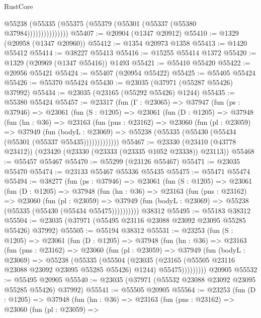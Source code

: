 \begin{lexlean}{RustCore}
\begin{coremodule}
                    @55238 (@55335 (@55375 (@55379 (@55301 (@55337 (@55380 @37984)))))))))))))))
@55407 := @20904 (@1347 @20912)
@55410 := @1329 (@20958 (@1347 @20960))
@55412 := @1354 @20973 @1358
@55413 := @1420 @55412
@55414 := @38227 @55413
@55416 := @15255 @55414 @1372
@55420 := @1329 (@20969 (@1347 @55416)) @1493
@55421 := @55410 @55420
@55422 := @20956 @55421
@55424 := @55407 (@20954 @55422)
@55425 := @55405 @55424
@55426 := @55370 @55424
@55430 := @23035 (@37971 (@55287 @55426) @37992)
@55434 := @23035 (@23165 (@55292 @55426) @1244)
@55435 := @55380 @55424
@55457 := @23317
    (fun (Γ : @23065) =>
    @37947
      (fun (ps : @37946) =>
      @23061
        (fun (S : @1205) =>
        @23061
          (fun (D : @1205) =>
          @37948
            (fun (hn : @36) =>
            @23163
              (fun (pns : @23162) =>
              @23060
                (fun (pl : @23059) =>
                @37949
                  (fun (bodyL : @23069) =>
                  @55238 (@55335 (@55430 (@55434 (@55301 (@55337 @55435)))))))))))))
@55467 := @23330 (@23410 (@43778 @23412)) (@23420 (@23330 (@23333 (@23335 @1052 @23338)) @23113))
@55468 := @55457 @55467
@55470 := @55299 (@23126 @55467)
@55471 := @23035 @55470
@55474 := @23133 @55467 @55336 @55435
@55475 := @55471 @55474
@55494 := @38277
    (fun (ps : @37946) =>
    @23061
      (fun (S : @1205) =>
      @23061
        (fun (D : @1205) =>
        @37948
          (fun (hn : @36) =>
          @23163
            (fun (pns : @23162) =>
            @23060
              (fun (pl : @23059) =>
              @37949 (fun (bodyL : @23069) => @55238 (@55335 (@55430 (@55434 @55475))))))))))
    @38312
@55495 := @55183 @38312
@55504 := @23035 (@37971 (@55495 @23116 @23088 @23092 @23095 @55285 @55426) @37992)
@55505 := @55194 @38312
@55531 := @23253
    (fun (S : @1205) =>
    @23061
      (fun (D : @1205) =>
      @37948
        (fun (hn : @36) =>
        @23163
          (fun (pns : @23162) =>
          @23060
            (fun (pl : @23059) =>
            @37949
              (fun (bodyL : @23069) =>
              @55238
                (@55335
                  (@55504
                    (@23035
                      (@23165 (@55505 @23116 @23088 @23092 @23095 @55285 @55426) @1244)
                      @55475)))))))))
    @20905
@55532 := @55495 @20905
@55540 := @23035 (@37971 (@55532 @23088 @23092 @23095 @55285 @55426) @37992)
@55541 := @55505 @20905
@55564 := @23253
    (fun (D : @1205) =>
    @37948
      (fun (hn : @36) =>
      @23163
        (fun (pns : @23162) =>
        @23060
          (fun (pl : @23059) =>

\end{coremodule}
\end{lexlean}
